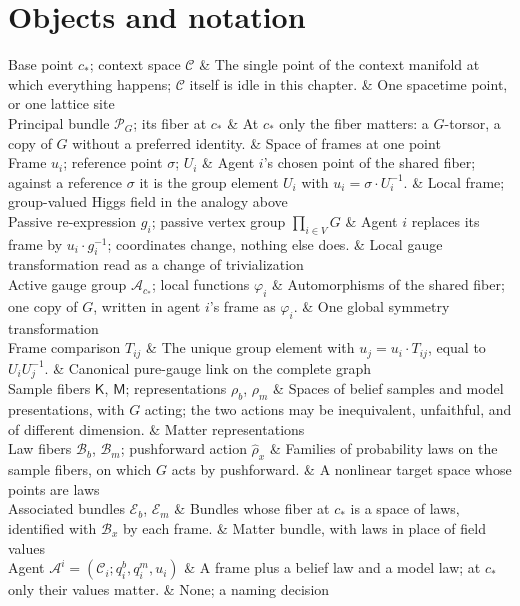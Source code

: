 \section{Objects and notation}
\label{comp:ch02-objects}

\begin{decoder}
Base point $c_*$; context space $\mathcal C$ & The single point of the context manifold at which everything happens; $\mathcal C$ itself is idle in this chapter. & One spacetime point, or one lattice site \\
Principal bundle $\mathscr P_G$; its fiber at $c_*$ & At $c_*$ only the fiber matters: a $G$-torsor, a copy of $G$ without a preferred identity. & Space of frames at one point \\
Frame $u_i$; reference point $\sigma$; $U_i$ & Agent $i$'s chosen point of the shared fiber; against a reference $\sigma$ it is the group element $U_i$ with $u_i=\sigma\cdot U_i^{-1}$. & Local frame; group-valued Higgs field in the analogy above \\
Passive re-expression $g_i$; passive vertex group $\prod_{i\in V}G$ & Agent $i$ replaces its frame by $u_i\cdot g_i^{-1}$; coordinates change, nothing else does. & Local gauge transformation read as a change of trivialization \\
Active gauge group $\mathcal A_{c_*}$; local functions $\varphi_i$ & Automorphisms of the shared fiber; one copy of $G$, written in agent $i$'s frame as $\varphi_i$. & One global symmetry transformation \\
Frame comparison $T_{ij}$ & The unique group element with $u_j=u_i\cdot T_{ij}$, equal to $U_iU_j^{-1}$. & Canonical pure-gauge link on the complete graph \\
Sample fibers $\mathsf K$, $\mathsf M$; representations $\rho_b$, $\rho_m$ & Spaces of belief samples and model presentations, with $G$ acting; the two actions may be inequivalent, unfaithful, and of different dimension. & Matter representations \\
Law fibers $\mathcal B_b$, $\mathcal B_m$; pushforward action $\widehat\rho_x$ & Families of probability laws on the sample fibers, on which $G$ acts by pushforward. & A nonlinear target space whose points are laws \\
Associated bundles $\mathcal E_b$, $\mathcal E_m$ & Bundles whose fiber at $c_*$ is a space of laws, identified with $\mathcal B_x$ by each frame. & Matter bundle, with laws in place of field values \\
Agent $\mathcal A^i=(\mathcal C_i;q_i^b,q_i^m,u_i)$ & A frame plus a belief law and a model law; at $c_*$ only their values matter. & None; a naming decision \\

\end{decoder}
